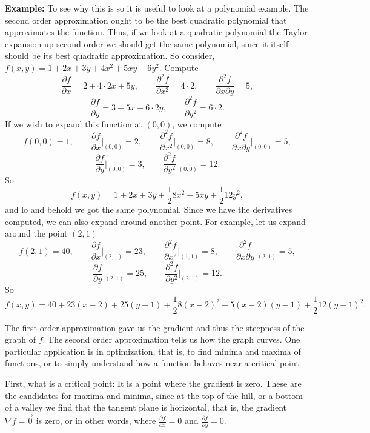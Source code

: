 \documentclass[12pt]{article}
\begin{document}
\medskip

\textbf{Example:}
To see why this is so it is useful to look at a polynomial example.  The
second order approximation ought to be the best quadratic polynomial that
approximates the function.  Thus, if we look at a quadratic polynomial the
Taylor expansion up second order we should get the same polynomial, since it
itself should be its best quadratic approximation.
So consider, $f(x,y) = 1 + 2x + 3y + 4x^2+ 5xy + 6y^2$.  Compute
$$
\frac{\partial f}{\partial x} = 2 + 4 \cdot 2x + 5y, \qquad
\frac{\partial^2 f}{\partial x^2} = 4 \cdot 2, \qquad
\frac{\partial^2 f}{\partial x \partial y} = 5 ,
$$
$$
\frac{\partial f}{\partial y} = 3 + 5x + 6 \cdot 2y, \qquad
\frac{\partial^2 f}{\partial y^2} = 6 \cdot 2 .
$$
If we wish to expand this function at $(0,0)$, we compute
$$
f(0,0) = 1, \qquad
\frac{\partial f}{\partial x}\Big|_{(0,0)} = 2, \qquad
\frac{\partial^2 f}{\partial x^2}\Big|_{(0,0)} = 8, \qquad
\frac{\partial^2 f}{\partial x \partial y}\Big|_{(0,0)} = 5 ,
$$
$$
\frac{\partial f}{\partial y}\Big|_{(0,0)} = 3, \qquad
\frac{\partial^2 f}{\partial y^2}\Big|_{(0,0)} = 12 .
$$
So
\begin{equation*}
f(x,y) = 1 + 2 x + 3 y + \frac{1}{2} 8 x^2 + 5 xy + \frac{1}{2} 12 y^2 ,
\end{equation*}
and lo and behold we got the same polynomial.
Since we have the derivatives computed, we can also expand around another
point.  For example, let us expand around the point $(2,1)$
$$
f(2,1) = 40, \qquad
\frac{\partial f}{\partial x}\Big|_{(2,1)} = 23, \qquad
\frac{\partial^2 f}{\partial x^2}\Big|_{(1,1)} = 8, \qquad
\frac{\partial^2 f}{\partial x \partial y}\Big|_{(2,1)} = 5 ,
$$
$$
\frac{\partial f}{\partial y}\Big|_{(2,1)} = 25, \qquad
\frac{\partial^2 f}{\partial y^2}\Big|_{(2,1)} = 12 .
$$
So
\begin{equation*}
f(x,y) = 40 + 23(x-2) + 25 (y-1) + \frac{1}{2} 8 (x-2)^2 + 5 (x-2)(y-1) +
\frac{1}{2} 12 (y-1)^2 .
\end{equation*}

\medskip

The first order approximation gave us the gradient and thus the
steepness of the graph of $f$.  The second order approximation tells us how
the graph curves.  One particular application is in optimization, that is,
to find minima and maxima of functions, or to simply understand how a
function behaves near a critical point.

First, what is a critical point:  It is a point where the gradient is zero.
These are the candidates for maxima and minima, since at the top of the
hill, or a bottom of a valley we find that the tangent plane is horizontal,
that is, the gradient $\nabla f = \vec{0}$ is zero,
or in other words, where
$\frac{\partial f}{\partial x} = 0$ and
$\frac{\partial f}{\partial y} = 0$.
\end{document}
